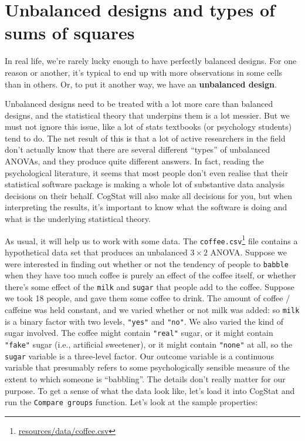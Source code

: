 \documentclass[
  11pt,
  a4paper,
  twoside,symmetric,openright]{book}
\theoremstyle{break}
\theoremstyle{break}
\DeclareRobustCommand{\href}[2]{#2\footnote{\url{#1}}}
\begin{document}
\section{Unbalanced designs and types of sums of squares}\label{unbalancedanova}

In real life, we're rarely lucky enough to have perfectly balanced designs. For one reason or another, it's typical to end up with more observations in some cells than in others. Or, to put it another way, we have an \textbf{unbalanced design}.

Unbalanced designs need to be treated with a lot more care than balanced designs, and the statistical theory that underpins them is a lot messier. But we must not ignore this issue, like a lot of stats textbooks (or psychology students) tend to do. The net result of this is that a lot of active researchers in the field don't actually know that there are several different ``types'' of unbalanced ANOVAs, and they produce quite different answers. In fact, reading the psychological literature, it seems that most people don't even realise that their statistical software package is making a whole lot of substantive data analysis decisions on their behalf. CogStat will also make all decisions for you, but when interpreting the results, it's important to know what the software is doing and what is the underlying statistical theory.

As usual, it will help us to work with some data. The \href{resources/data/coffee.csv}{\texttt{coffee.csv}} file contains a hypothetical data set that produces an unbalanced \(3 \times 2\) ANOVA. Suppose we were interested in finding out whether or not the tendency of people to \texttt{babble} when they have too much coffee is purely an effect of the coffee itself, or whether there's some effect of the \texttt{milk} and \texttt{sugar} that people add to the coffee. Suppose we took 18 people, and gave them some coffee to drink. The amount of coffee / caffeine was held constant, and we varied whether or not milk was added: so \texttt{milk} is a binary factor with two levels, \texttt{"yes"} and \texttt{"no"}. We also varied the kind of sugar involved. The coffee might contain \texttt{"real"} sugar, or it might contain \texttt{"fake"} sugar (i.e., artificial sweetener), or it might contain \texttt{"none"} at all, so the \texttt{sugar} variable is a three-level factor. Our outcome variable is a continuous variable that presumably refers to some psychologically sensible measure of the extent to which someone is ``babbling''. The details don't really matter for our purpose. To get a sense of what the data look like, let's load it into CogStat and run the \texttt{Compare\ groups} function. Let's look at the sample properties:
\end{document}
